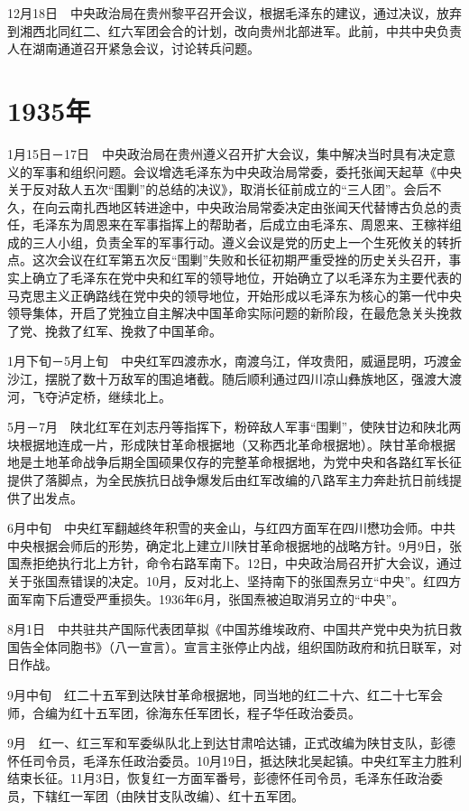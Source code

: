 \documentclass[10pt,a4paper,twocolumn]{book}
\begin{document}
12月18日　中央政治局在贵州黎平召开会议，根据毛泽东的建议，通过决议，放弃到湘西北同红二、红六军团会合的计划，改向贵州北部进军。此前，中共中央负责人在湖南通道召开紧急会议，讨论转兵问题。

\section{1935年}

1月15日－17日　中央政治局在贵州遵义召开扩大会议，集中解决当时具有决定意义的军事和组织问题。会议增选毛泽东为中央政治局常委，委托张闻天起草《中央关于反对敌人五次“围剿”的总结的决议》，取消长征前成立的“三人团”。会后不久，在向云南扎西地区转进途中，中央政治局常委决定由张闻天代替博古负总的责任，毛泽东为周恩来在军事指挥上的帮助者，后成立由毛泽东、周恩来、王稼祥组成的三人小组，负责全军的军事行动。遵义会议是党的历史上一个生死攸关的转折点。这次会议在红军第五次反“围剿”失败和长征初期严重受挫的历史关头召开，事实上确立了毛泽东在党中央和红军的领导地位，开始确立了以毛泽东为主要代表的马克思主义正确路线在党中央的领导地位，开始形成以毛泽东为核心的第一代中央领导集体，开启了党独立自主解决中国革命实际问题的新阶段，在最危急关头挽救了党、挽救了红军、挽救了中国革命。

1月下旬－5月上旬　中央红军四渡赤水，南渡乌江，佯攻贵阳，威逼昆明，巧渡金沙江，摆脱了数十万敌军的围追堵截。随后顺利通过四川凉山彝族地区，强渡大渡河，飞夺泸定桥，继续北上。

5月－7月　陕北红军在刘志丹等指挥下，粉碎敌人军事“围剿”，使陕甘边和陕北两块根据地连成一片，形成陕甘革命根据地（又称西北革命根据地）。陕甘革命根据地是土地革命战争后期全国硕果仅存的完整革命根据地，为党中央和各路红军长征提供了落脚点，为全民族抗日战争爆发后由红军改编的八路军主力奔赴抗日前线提供了出发点。

6月中旬　中央红军翻越终年积雪的夹金山，与红四方面军在四川懋功会师。中共中央根据会师后的形势，确定北上建立川陕甘革命根据地的战略方针。9月9日，张国焘拒绝执行北上方针，命令右路军南下。12日，中央政治局召开扩大会议，通过关于张国焘错误的决定。10月，反对北上、坚持南下的张国焘另立“中央”。红四方面军南下后遭受严重损失。1936年6月，张国焘被迫取消另立的“中央”。

8月1日　中共驻共产国际代表团草拟《中国苏维埃政府、中国共产党中央为抗日救国告全体同胞书》（八一宣言）。宣言主张停止内战，组织国防政府和抗日联军，对日作战。

9月中旬　红二十五军到达陕甘革命根据地，同当地的红二十六、红二十七军会师，合编为红十五军团，徐海东任军团长，程子华任政治委员。

9月　红一、红三军和军委纵队北上到达甘肃哈达铺，正式改编为陕甘支队，彭德怀任司令员，毛泽东任政治委员。10月19日，抵达陕北吴起镇。中央红军主力胜利结束长征。11月3日，恢复红一方面军番号，彭德怀任司令员，毛泽东任政治委员，下辖红一军团（由陕甘支队改编）、红十五军团。
\end{document}
